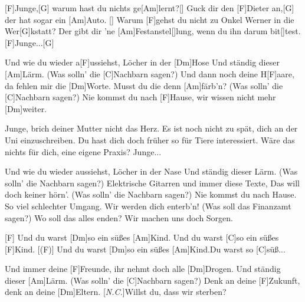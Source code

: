 

\hfill{}

\begin{guitar}
	[F]Junge,[G] warum hast du nichts ge[Am]lernt?[]{}
	Guck dir den [F]Dieter an,[G] der hat sogar ein [Am]Auto. []{}
	Warum [F]gehst du nicht zu Onkel Werner in die Wer[G]kstatt?
	Der gibt dir 'ne [Am]Festanstel[]lung, wenn du ihn darum bit[]test.
	[F]Junge...[G]{}
	
	\begin{highlightbar}
		Und wie du wieder a[F]ussiehst, Löcher in der [Dm]Hose
		Und ständig dieser [Am]Lärm. (Was solln' die [C]Nachbarn sagen?)
		Und dann noch deine H[F]aare, da fehlen mir die [Dm]Worte.
		Musst du die denn [Am]färb'n? (Was solln' die [C]Nachbarn sagen?)
		Nie kommst du nach [F]Hause, wir wissen nicht mehr [Dm]weiter.
	\end{highlightbar}
	
	\songsection{Strophe 2}
	Junge, brich deiner Mutter nicht das Herz.
	Es ist noch nicht zu spät, dich an der Uni einzuschreiben.
	Du hast dich doch früher so für Tiere interessiert.
	Wäre das nichts für dich, eine eigene Praxis?
	Junge...
	
	\begin{highlightbar}
		\songsection{Refrain 2}
		Und wie du wieder aussiehst, Löcher in der Nase
		Und ständig dieser Lärm. (Was solln' die Nachbarn sagen?)
		Elektrische Gitarren und immer diese Texte,
		Das will doch keiner hörn'. (Was solln' die Nachbarn sagen?)
		Nie kommst du nach Hause. So viel schlechter Umgang.
		Wir werden dich enterb'n! (Was soll das Finanzamt sagen?)
		Wo soll das alles enden? Wir machen uns doch Sorgen.
	\end{highlightbar}
	
	\songsection{Bridge}
	[F] Und du warst [Dm]so ein süßes [Am]Kind. Und du warst [C]so ein süßes [F]Kind.
	[(F)] Und du warst [Dm]so ein süßes [Am]Kind.Du warst so [C]süß...
	
	\begin{highlightbar}
		\songsection{Refrain 3}
		Und immer deine [F]Freunde, ihr nehmt doch alle [Dm]Drogen.
		Und ständig dieser [Am]Lärm. (Was solln' die [C]Nachbarn sagen?)
		Denk an deine [F]Zukunft, denk an deine [Dm]Eltern.
		[\textit{N.C.}]Willst du, dass wir sterben? 
	\end{highlightbar}
\end{guitar}